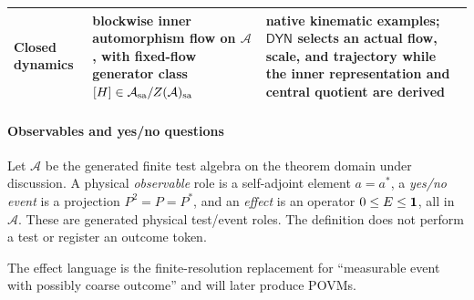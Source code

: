 \documentclass[12pt,a4paper]{article}
\begin{document}
\begin{table}[!htbp]
\begin{tabularx}{\textwidth}{>{\raggedright\arraybackslash}p{}
                                >{\raggedright\arraybackslash}X
                                >{\raggedright\arraybackslash}p{}}
Closed dynamics & blockwise inner automorphism flow on \(\mathcal A\), with
fixed-flow generator class \([H]\in\mathcal A_{\rm sa}/Z(\mathcal A)_{\rm sa}\) &
native kinematic examples; \(\mathsf{DYN}\) selects an actual flow, scale,
and trajectory while the inner representation and central quotient are
derived \\
\bottomrule
\end{tabularx}
\end{table}



\paragraph{Observables and yes/no questions}
\label{p4:sec:part1-observables}


\begin{definition}
\label{p4:def:observable-event}
Let \(\mathcal A\) be the generated finite test algebra on the theorem domain
under discussion.  A physical \emph{observable} role is a self-adjoint
element \(a=a^*\), a \emph{yes/no event} is a projection
\(P^2=P=P^*\), and an \emph{effect} is an operator
\(0\le E\le\mathbf{1}\), all in \(\mathcal A\).  These are generated physical
test/event roles.  The definition does not perform a test or register an
outcome token.
\end{definition}


The effect language is the finite-resolution replacement for ``measurable event with possibly coarse outcome'' and will later produce POVMs.
\end{document}
